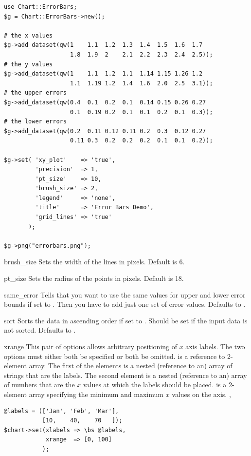 \begin{verbatim}
use Chart::ErrorBars;
$g = Chart::ErrorBars->new();

# the x values
$g->add_dataset(qw(1    1.1  1.2  1.3  1.4  1.5  1.6  1.7
                   1.8  1.9  2    2.1  2.2  2.3  2.4  2.5));
# the y values
$g->add_dataset(qw(1    1.1  1.2  1.1  1.14 1.15 1.26 1.2
                   1.1  1.19 1.2  1.4  1.6  2.0  2.5  3.1));
# the upper errors
$g->add_dataset(qw(0.4  0.1  0.2  0.1  0.14 0.15 0.26 0.27
                   0.1  0.19 0.2  0.1  0.1  0.2  0.1  0.3));
# the lower errors
$g->add_dataset(qw(0.2  0.11 0.12 0.11 0.2  0.3  0.12 0.27
                   0.11 0.3  0.2  0.2  0.2  0.1  0.1  0.2));

$g->set( 'xy_plot'    => 'true',
         'precision'  => 1,
         'pt_size'    => 10,
         'brush_size' => 2,
         'legend'     => 'none',
         'title'      => 'Error Bars Demo',
         'grid_lines' => 'true'
       );

$g->png("errorbars.png");
\end{verbatim}

\constructorblurb{\thisname}

\begin{AttrDecl}{brush\_size}
Sets the width of the lines in pixels. Default is 6.
\end{AttrDecl}

\begin{AttrDecl}{pt\_size}
Sets the radius of the points in pixels. Default is 18.
\end{AttrDecl}

\begin{AttrDecl}{same\_error}
Tells \thisclass that you want to use the same values for
upper and lower error bounds if set to . Then you have to
add just one set of error values. Defaults to .
\end{AttrDecl}

\begin{AttrDecl}{sort}
Sorts the data in ascending order if set to . Should be
set if the input data is not sorted. Defaults to .
\end{AttrDecl}

\begin{AttrDecl}{xrange}
This pair of options allows arbitrary positioning of $x$ axis labels.
The two options must either both be specified or both be omitted.
 is a reference to 2-element array. The first of the
elements is a nested (reference to an) array of strings that are the
labels. The second element is a nested (reference to an) array of
numbers that are the $x$ values at which the labels should be placed.
 is a 2-element array specifying the minimum and maximum
$x$ values on the axis. \Eg,
\begin{verbatim}
@labels = (['Jan', 'Feb', 'Mar'],
           [10,    40,    70   ]);
$chart->set(xlabels => \bs @labels,
            xrange  => [0, 100]
           );
\end{verbatim}
\end{AttrDecl}

